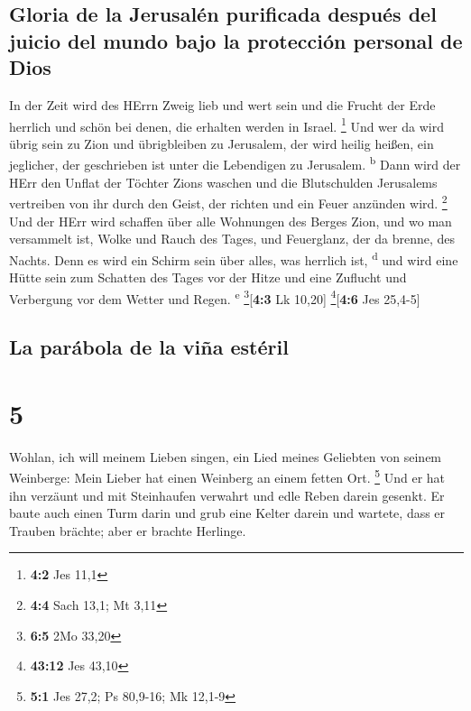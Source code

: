 \hypertarget{gloria-de-la-jerusaluxe9n-purificada-despuuxe9s-del-juicio-del-mundo-bajo-la-protecciuxf3n-personal-de-dios}{%
\subsection{Gloria de la Jerusalén purificada después del juicio del
mundo bajo la protección personal de
Dios}\label{gloria-de-la-jerusaluxe9n-purificada-despuuxe9s-del-juicio-del-mundo-bajo-la-protecciuxf3n-personal-de-dios}}

 In der Zeit wird des HErrn Zweig lieb und wert sein und
die Frucht der Erde herrlich und schön bei denen, die erhalten werden in
Israel. \footnote{\textbf{4:2} Jes 11,1}  Und wer da wird
übrig sein zu Zion und übrigbleiben zu Jerusalem, der wird heilig
heißen, ein jeglicher, der geschrieben ist unter die Lebendigen zu
Jerusalem. \textsuperscript{b}  Dann wird der HErr den
Unflat der Töchter Zions waschen und die Blutschulden Jerusalems
vertreiben von ihr durch den Geist, der richten und ein Feuer anzünden
wird. \footnote{\textbf{4:4} Sach 13,1; Mt 3,11}  Und der
HErr wird schaffen über alle Wohnungen des Berges Zion, und wo man
versammelt ist, Wolke und Rauch des Tages, und Feuerglanz, der da
brenne, des Nachts. Denn es wird ein Schirm sein über alles, was
herrlich ist, \textsuperscript{d}  und wird eine Hütte
sein zum Schatten des Tages vor der Hitze und eine Zuflucht und
Verbergung vor dem Wetter und Regen. \textsuperscript{e}
\footnote{\textbf{6:5} 2Mo 33,20}{[}\textbf{4:3} Lk 10,20{]}
\footnote{\textbf{43:12} Jes 43,10}{[}\textbf{4:6} Jes 25,4-5{]}

\hypertarget{la-paruxe1bola-de-la-viuxf1a-estuxe9ril}{%
\subsection{La parábola de la viña
estéril}\label{la-paruxe1bola-de-la-viuxf1a-estuxe9ril}}

\hypertarget{section-4}{%
\section{5}\label{section-4}}

 Wohlan, ich will meinem Lieben singen, ein Lied meines
Geliebten von seinem Weinberge: Mein Lieber hat einen Weinberg an einem
fetten Ort. \footnote{\textbf{5:1} Jes 27,2; Ps 80,9-16; Mk 12,1-9}
 Und er hat ihn verzäunt und mit Steinhaufen verwahrt und
edle Reben darein gesenkt. Er baute auch einen Turm darin und grub eine
Kelter darein und wartete, dass er Trauben brächte; aber er brachte
Herlinge.

